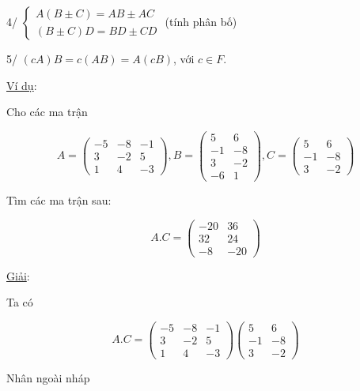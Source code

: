 \documentclass[12pt,a4paper]{article} \usepackage[utf8]{inputenc} \usepackage[T5]{fontenc} \usepackage[vietnamese]{babel} \usepackage{amsmath, amssymb, amsfonts} \usepackage{ulem}
\begin{document}
4/ $\begin{cases} A(B \pm C) = AB \pm AC \\ (B \pm C)D = BD \pm CD \end{cases}$ (tính phân bố)

5/ $(cA)B = c(AB) = A(cB)$, với $c \in F$.

\ul{Ví dụ}:

Cho các ma trận

$$
A = \begin{pmatrix} -5 & -8 & -1 \\ 3 & -2 & 5 \\ 1 & 4 & -3 \end{pmatrix}, B = \begin{pmatrix} 5 & 6 \\ -1 & -8 \\ 3 & -2 \\ -6 & 1 \end{pmatrix}, C = \begin{pmatrix} 5 & 6 \\ -1 & -8 \\ 3 & -2 \end{pmatrix}
$$

Tìm các ma trận sau:

$$
A.C = \begin{pmatrix} -20 & 36 \\ 32 & 24 \\ -8 & -20 \end{pmatrix}
$$

\ul{Giải}:

Ta có

$$
A.C = \begin{pmatrix} -5 & -8 & -1 \\ 3 & -2 & 5 \\ 1 & 4 & -3 \end{pmatrix} \begin{pmatrix} 5 & 6 \\ -1 & -8 \\ 3 & -2 \end{pmatrix}
$$

Nhân ngoài nháp

\begin{center}
\end{center}
\end{document}
